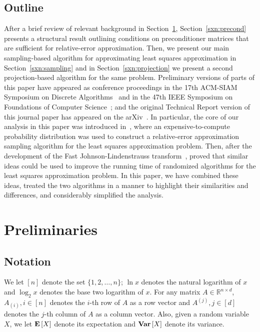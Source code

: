 \documentclass[11pt]{article}
\newcommand{\Expect}[1]{\mbox{}{\bf{E}}\left[#1\right]}
\newcommand{\Varnce}[1]{\mbox{}{\bf{Var}}\left[#1\right]}
\begin{document}
\subsection{Outline}

After a brief review of relevant background in Section~\ref{sxn:review_la}, Section~\ref{sxn:precond} presents a structural result outlining conditions on preconditioner matrices that are sufficient for relative-error approximation. Then, we present our main sampling-based algorithm for approximating least squares approximation in Section~\ref{sxn:sampling} and in Section~\ref{sxn:projection} we present a second projection-based algorithm for the same problem.
Preliminary versions of parts of this paper have appeared as conference
proceedings in the 17th ACM-SIAM Symposium on Discrete
Algorithms~\cite{DMM06} and in the 47th IEEE Symposium on Foundations of
Computer Science~\cite{Sarlos06}; and the original Technical Report version
of this journal paper has appeared on the arXiv~\cite{DMMS07_FastL2_TR}.
In particular, the core of our analysis in this paper was introduced in~\cite{DMM06}, where an expensive-to-compute probability distribution was used to construct a relative-error approximation sampling algorithm for the least squares approximation problem. Then, after the development of the Fast Johnson-Lindenstrauss transform~\cite{AC06}, \cite{Sarlos06} proved that similar ideas could be used to improve the running time of randomized algorithms for the least squares approximation problem. In this paper, we have combined these ideas, treated the two algorithms in a manner to highlight their similarities and differences, and considerably simplified the analysis.

\section{Preliminaries}
\label{sxn:review_la}

\subsection{Notation}

We let $[n]$ denote the set $\{1,2,\ldots,n\}$; $\ln x$ denotes the natural logarithm of $x$ and $\log_2 x$ denotes the base two logarithm of $x$. For any matrix $A \in \mathbb{R}^{n \times d}$, $A_{(i)}, i \in [n]$ denotes the $i$-th row of $A$ as a row vector and $A^{(j)}, j \in [d]$ denotes the $j$-th column of $A$ as a column vector. Also, given a random variable $X$, we let $\Expect{X}$ denote its expectation and $\Varnce{X}$ denote its variance.
\end{document}
